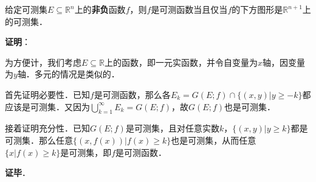 \begin{theorem}{}\label{MsbFun_the4}

给定可测集$E\subseteq\mathbb{R}^n$上的\textbf{非负}函数$f$，则$f$是可测函数当且仅当$f$的下方图形是$\mathbb{R}^{n+1}$上的可测集．

\end{theorem}

\textbf{证明}：

为方便计，我们考虑$E\subseteq\mathbb{R}$上的函数，即一元实函数，并令自变量为$x$轴，因变量为$y$轴．多元的情况是类似的．

首先证明必要性．已知$f$是可测函数，那么各$E_k=G(E; f)\cap\{(x, y)|y\geq -k\}$都应该是可测集．又因为$\bigcup^\infty_{k=1} E_k=G(E; f)$，故$G(E; f)$也是可测集．

接着证明充分性．已知$G(E; f)$是可测集，且对任意实数$k$，$\{(x, y)|y\geq k\}$都是可测集．那么任意$\{(x, f(x))|f(x)\geq k\}$也是可测集，从而任意$\{x|f(x)\geq k\}$是可测集，即$f$是可测函数．

\textbf{证毕}．



